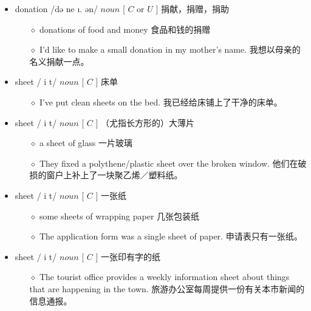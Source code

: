 \documentclass[a4paper,top=2.5cm,buttom=2.5cm10.5pt]{book}
\begin{document}
\begin{itemize}
\item donation /də \textupsilon  \textprimstress ne \i . \textesh ən/ $ noun $ [  $ C $  or  $ U $  ] 捐献，捐赠，捐助
\begin{itemize}
\item[$\diamond$] donations of food and money
食品和钱的捐赠
\item[$\diamond$] I'd like to make a small donation in my mother's name.
我想以母亲的名义捐献一点。
\end{itemize}
\end{itemize}
\begin{itemize}
\item sheet / \textesh i \textlengthmark t/ $ noun $ [  $ C $  ] 床单
\begin{itemize}
\item[$\diamond$] I've put clean sheets on the bed.
我已经给床铺上了干净的床单。
\end{itemize}
\end{itemize}
\begin{itemize}
\item sheet / \textesh i \textlengthmark t/ $ noun $ [  $ C $  ] （尤指长方形的）大薄片
\begin{itemize}
\item[$\diamond$] a sheet of glass
一片玻璃
\item[$\diamond$] They fixed a polythene/plastic sheet over the broken window.
他们在破损的窗户上补上了一块聚乙烯／塑料纸。
\end{itemize}
\end{itemize}
\begin{itemize}
\item sheet / \textesh i \textlengthmark t/ $ noun $ [  $ C $  ] 一张纸
\begin{itemize}
\item[$\diamond$] some sheets of wrapping paper
几张包装纸
\item[$\diamond$] The application form was a single sheet of paper.
申请表只有一张纸。
\end{itemize}
\end{itemize}
\begin{itemize}
\item sheet / \textesh i \textlengthmark t/ $ noun $ [  $ C $  ] 一张印有字的纸
\begin{itemize}
\item[$\diamond$] The tourist office provides a weekly information sheet about things that are happening in the town.
旅游办公室每周提供一份有关本市新闻的信息通报。
\end{itemize}
\end{itemize}
\end{document}
